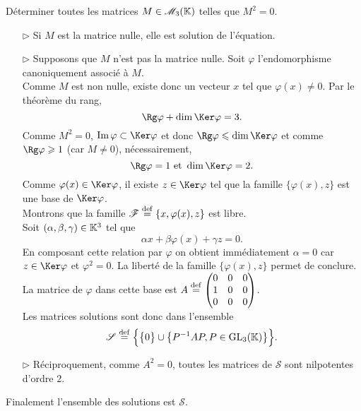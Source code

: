 \begin{exercice}
    Déterminer toutes les matrices $M \in \mathscr{M}_3(\mathbb{K})$ telles que $M^2=0$.
\end{exercice}

\begin{solution}
    \begin{itemize}
        \item[$\rhd$] Si $M$ est la matrice nulle, elle est solution de l'équation.
        \item[$\rhd$] Supposons que $M$ n'est pas la matrice nulle. Soit $\varphi$ l'endomorphisme canoniquement associé à $M$. \\
        Comme $M$ est non nulle, existe donc un vecteur $x$ tel que $\varphi(x) \not= 0$. Par le théorème du rang, 
        $$\Rg \varphi + \dim \Ker \varphi = 3.$$ 
        Comme $M^2 = 0$, $\Im \varphi \subset \Ker \varphi$ et donc $\Rg \varphi \leqslant \dim \Ker \varphi$ et comme $\Rg \varphi \geqslant 1$ (car $M \not=0$), nécessairement, 
        $$\Rg \varphi = 1 \text{ et } \dim \Ker \varphi = 2.$$
        Comme $\varphi(x) \in \Ker \varphi$, il existe $z \in \Ker \varphi$ tel que la famille $\{ \varphi(x), z \}$ est une base de $\Ker \varphi$. \\
        Montrons que la famille $\mathscr{F} \overset{\mathrm{\tiny def}}{=} \{x, \varphi(x), z \}$ est libre. \\
        Soit $(\alpha, \beta, \gamma) \in \mathbb{K}^3$ tel que 
        $$\alpha x + \beta \varphi(x) + \gamma z = 0.$$
        En composant cette relation par $\varphi$ on obtient immédiatement $\alpha = 0$ car $z \in \Ker \varphi$ et $\varphi^2 = 0$. La liberté de la famille $\{ \varphi(x), z \}$ permet de conclure. \\
        La matrice de $\varphi$ dans cette base est 
        $A \overset{\mathrm{\tiny def}}{=}
        \begin{pmatrix}
        0 & 0 & 0 \\
        1 & 0 & 0 \\ 
        0 & 0 & 0
        \end{pmatrix}
        $. \\
        Les matrices solutions sont donc dans l'ensemble
        $$\mathscr{S} \overset{\mathrm{\tiny def}}{=} \Big\{ \big\{0\big\} \cup \big\{P^{-1} A P, P \in \mathrm{GL}_3(\mathbb{K}) \big\} \Big\}.$$
        \item[$\rhd$] Réciproquement, comme $A^2 = 0$, toutes les matrices de $\mathscr{S}$ sont nilpotentes d'ordre $2$. \\
    \end{itemize}
    Finalement l'ensemble des solutions est $\mathscr{S}$.
\end{solution}
